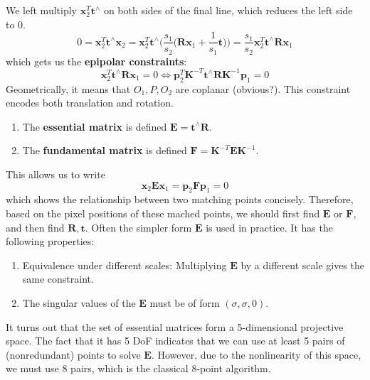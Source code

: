 \documentclass{article}
\newcounter{algo}[section]
\newcounter{code}[section]
\begin{document}
  We left multiply $\mathbf{x}_2^T \mathbf{t}^\wedge$ on both sides of the final line, which reduces the left side to $0$. 
  \begin{equation}
    0 = \mathbf{x}_2^T \mathbf{t}^\wedge \mathbf{x}_2 = \mathbf{x}_2^T \mathbf{t}^\wedge \bigg( \frac{s_1}{s_2} \big( \mathbf{R} \mathbf{x}_1 + \frac{1}{s_1} \mathbf{t} \big) \bigg) = \frac{s_1}{s_2} \mathbf{x}_2^T \mathbf{t}^\wedge \mathbf{R} \mathbf{x}_1
  \end{equation}
  which gets us the \textbf{epipolar constraints}: 
  \begin{equation}
    \mathbf{x}_2^T \mathbf{t}^\wedge \mathbf{R} \mathbf{x}_1 = 0 \iff \mathbf{p}_2^T \mathbf{K}^{-T} \mathbf{t}^\wedge \mathbf{R} \mathbf{K}^{-1} \mathbf{p}_1 = 0
  \end{equation}
  Geometrically, it means that $O_1, P, O_2$ are coplanar (obvious?). This constraint encodes both translation and rotation. 
  \begin{enumerate}
      \item The \textbf{essential matrix} is defined $\mathbf{E} = \mathbf{t}^\wedge \mathbf{R}$. 
      \item The \textbf{fundamental matrix} is defined $\mathbf{F} = \mathbf{K}^{-T} \mathbf{E} \mathbf{K}^{-1}$. 
  \end{enumerate}
  This allows us to write 
  \begin{equation}
    \mathbf{x}_2 \mathbf{E} \mathbf{x}_1 = \mathbf{p}_2 \mathbf{F} \mathbf{p}_1 = 0
  \end{equation}
  which shows the relationship between two matching points concisely. Therefore, based on the pixel positions of these mached points, we should first find $\mathbf{E}$ or $\mathbf{F}$, and then find $\mathbf{R}, \mathbf{t}$. Often the simpler form $\mathbf{E}$ is used in practice. It has the following properties: 
  \begin{enumerate}
      \item Equivalence under different scales: Multiplying $\mathbf{E}$ by a different scale gives the same constraint. 
      \item The singular values of the $\mathbf{E}$ must be of form $(\sigma, \sigma, 0)$. 
  \end{enumerate}
  It turns out that the set of essential matrices form a 5-dimensional projective space. The fact that it has 5 DoF indicates that we can use at least 5 pairs of (nonredundant) points to solve $\mathbf{E}$. However, due to the nonlinearity of this space, we must use 8 pairs, which is the classical 8-point algorithm. 
\end{document}
